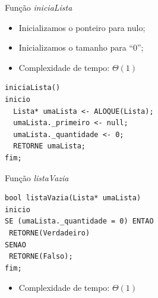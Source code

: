 \documentclass[12pt,table,xcolor={dvipsnames}]{beamer}
\begin{document}
\begin{frame}[fragile]{Função \textit{iniciaLista}}

\begin{itemize}
\item Inicializamos o ponteiro para nulo;
\item Inicializamos o tamanho para ``0'';
\item Complexidade de tempo: $\Theta(1)$
\end{itemize}
\begin{lstlisting}
iniciaLista()
inicio
  Lista* umaLista <- ALOQUE(Lista);
  umaLista._primeiro <- null;
  umaLista._quantidade <- 0;
  RETORNE umaLista;
fim;
\end{lstlisting}
\end{frame}


\begin{frame}[fragile]{Função \textit{listaVazia}}

\begin{lstlisting}
bool listaVazia(Lista* umaLista)
inicio
SE (umaLista._quantidade = 0) ENTAO
 RETORNE(Verdadeiro)
SENAO
 RETORNE(Falso);
fim;
\end{lstlisting}
\begin{itemize}
	\item Complexidade de tempo: $\Theta(1)$
\end{itemize}
\end{frame}
\end{document}
